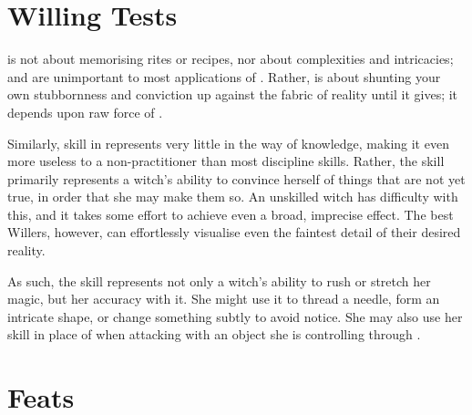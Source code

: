 \section{Willing Tests}

 is not about memorising rites or recipes, nor about complexities and intricacies;  and  are unimportant to most applications of .
Rather,  is about shunting your own stubbornness and conviction up against the fabric of reality until it gives; it depends upon raw force of .

Similarly, skill in  represents very little in the way of knowledge, making it even more useless to a non-practitioner than most discipline skills.
Rather, the skill primarily represents a witch's ability to convince herself of things that are not yet true, in order that she may make them so.
An unskilled witch has difficulty with this, and it takes some effort to achieve even a broad, imprecise effect.
The best Willers, however, can effortlessly visualise even the faintest detail of their desired reality.

As such, the  skill represents not only a witch's ability to rush or stretch her magic, but her accuracy with it.
She might use it to thread a needle, form an intricate shape, or change something subtly to avoid notice.
She may also use her  skill in place of  when attacking with an object she is controlling through .

\section{Feats}


